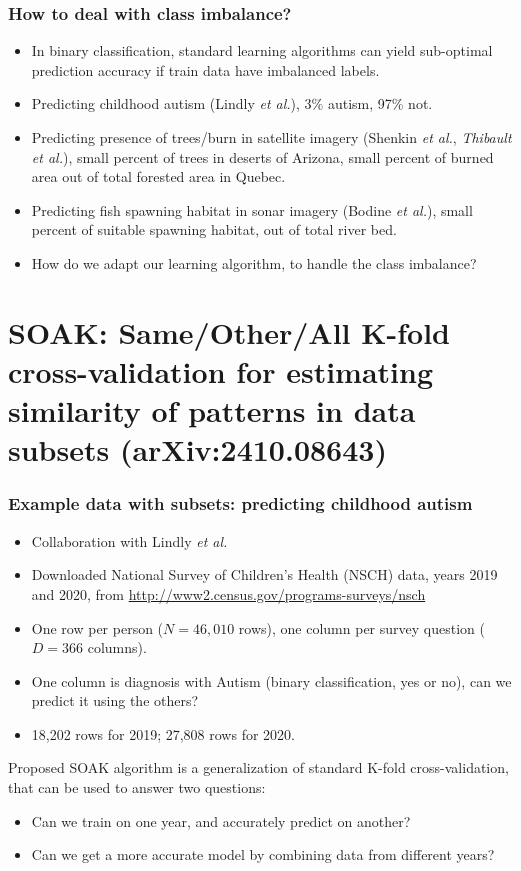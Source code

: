 \documentclass[t]{beamer}
\begin{document}
\begin{frame}
  \frametitle{How to deal with class imbalance?}
  \begin{itemize}
  \item In binary classification, standard learning algorithms can yield sub-optimal prediction accuracy if train data have imbalanced labels.
  \item Predicting childhood autism (Lindly \emph{et al.}), 3\% autism, 97\% not.
  \item Predicting presence of trees/burn in satellite imagery
    (Shenkin \emph{et al.}, \emph{Thibault} \emph{et al.}), small
    percent of trees in deserts of Arizona, small percent of burned
    area out of total forested area in Quebec.
  \item Predicting fish spawning habitat in sonar imagery (Bodine
    \emph{et al.}), small percent of suitable spawning habitat, out of
    total river bed.
  \item How do we adapt our learning algorithm, to handle the class imbalance?
  \end{itemize}
\end{frame}

\section{SOAK: Same/Other/All K-fold cross-validation for estimating similarity of patterns in data subsets (arXiv:2410.08643)}

\begin{frame}
  \frametitle{Example data with subsets: predicting childhood autism}

  \begin{itemize}
  \item Collaboration with Lindly \emph{et al.}
  \item Downloaded National Survey of Children's Health (NSCH) data,
    years 2019 and 2020, from
    \url{http://www2.census.gov/programs-surveys/nsch}
  \item One row per person ($N=46,010$ rows), one column per survey question ($D=366$ columns).
  \item One column is diagnosis with Autism (binary
    classification, yes or no), can we predict it using the others?
  \item 18,202 rows for 2019; 27,808 rows for 2020.
  \end{itemize}
  Proposed SOAK algorithm is a generalization of standard K-fold cross-validation, that can be used to answer two questions:
  \begin{itemize}
  \item Can we train on one year, and accurately predict on another?
  \item Can we get a more accurate model by combining data from different years?
  \end{itemize}

\end{frame} 
\end{document}
